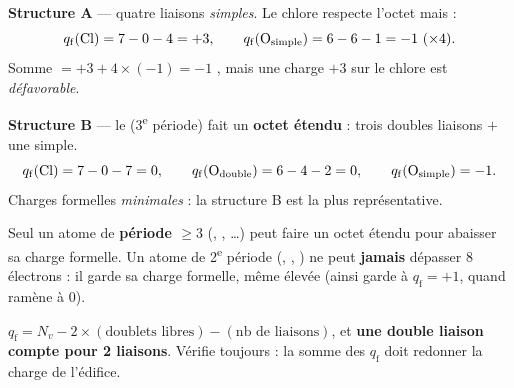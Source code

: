 \documentclass[11pt,a4paper]{article}
\newcommand{\CF}{\ensuremath{q_{\mathrm{f}}}}
\begin{document}
\begin{exbox}
\textbf{Structure A} — quatre liaisons  \emph{simples}. Le chlore respecte l'octet mais :
\[ \CF(\ce{Cl}) = 7 - 0 - 4 = +3, \qquad \CF(\ce{O}_{\text{simple}}) = 6 - 6 - 1 = -1\ \text{(×4)}. \]
Somme $= +3 + 4\times(-1) = -1$ \checkmark, mais une charge $+3$ sur le chlore est \emph{défavorable}.

\smallskip
\textbf{Structure B} — le  (3\textsuperscript{e} période) fait un \textbf{octet étendu} :
trois doubles liaisons $+$ une simple.
\[ \CF(\ce{Cl}) = 7 - 0 - 7 = 0, \qquad \CF(\ce{O}_{\text{double}}) = 6 - 4 - 2 = 0, \qquad
   \CF(\ce{O}_{\text{simple}}) = -1. \]
Charges formelles \emph{minimales} : la structure B est la plus représentative.
\end{exbox}

\begin{attnbox}
Seul un atome de \textbf{période $\geq 3$} (, , \ldots) peut faire un octet
étendu pour abaisser sa charge formelle. Un atome de 2\textsuperscript{e} période (, ,
) ne peut \textbf{jamais} dépasser $8$ électrons : il garde sa charge formelle, même élevée
(ainsi  garde  à $\CF = +1$, quand  ramène  à $0$).
\end{attnbox}

\begin{astucebox}
$\CF = N_v - 2\times(\text{doublets libres}) - (\text{nb de liaisons})$, et \textbf{une double
liaison compte pour 2 liaisons}. Vérifie toujours : la somme des \CF{} doit redonner la charge de
l'édifice.
\end{astucebox}
\end{document}
